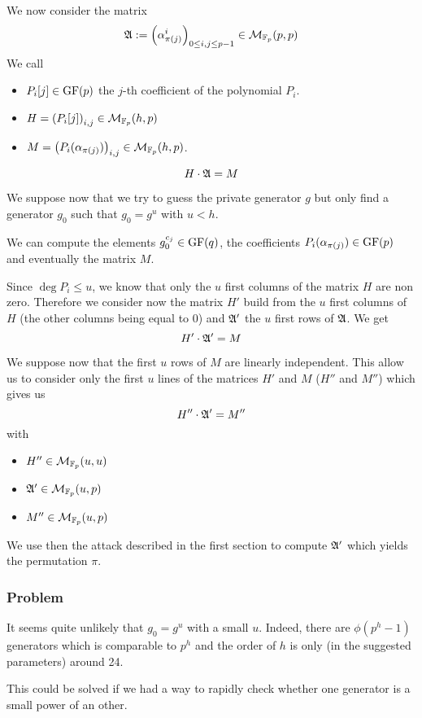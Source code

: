 \documentclass[12pt,a4paper,titlepage]{article}
\begin{document}
We now consider the matrix
$$ \frak{A} := \left( \alpha_{\pi(j)}^i \right)_{0 \leq i,j \leq p-1} \in \mathcal{M}_{\mathbb{F}_p}(p,p)$$
We call
\begin{itemize}
\item $P_i[j] \in \text{GF}(p)$ the $j$-th coefficient of the polynomial $P_i$.
\item $H = \left( P_i[j] \right)_{i,j} \in \mathcal{M}_{\mathbb{F}_p}(h,p)$
\item $M = \left( P_i(\alpha_{\pi(j)}) \right)_{i,j} \in \mathcal{M}_{\mathbb{F}_p}(h,p)$.
\end{itemize}

$$ H \cdot \frak{A} = M $$

We suppose now that we try to guess the private generator $g$ but only find a generator $g_0$ such that $g_0 = g^u$ with $u < h$.

We can compute the elements $g_0^{c_j} \in \text{GF}(q)$, the coefficients $P_i(\alpha_{\pi(j)}) \in \text{GF}(p)$ and eventually the matrix $M$.

Since $\deg P_i \leq u$, we know that only the $u$ first columns of the matrix $H$ are non zero. Therefore we consider now the matrix $H'$ build from the $u$ first columns of $H$ (the other columns being equal to 0) and $\frak{A}'$ the $u$ first rows of $\frak{A}$.
We get
$$ H' \cdot \frak{A}' = M $$

We suppose now that the first $u$ rows of $M$ are linearly independent. This allow us to consider only the first $u$ lines of the matrices $H'$ and $M$ ($H''$ and $M''$) which gives us
$$ H'' \cdot \frak{A}' = M'' $$
with
\begin{itemize}
\item $H'' \in \mathcal{M}_{\mathbb{F}_p}(u,u)$
\item $\frak{A}' \in \mathcal{M}_{\mathbb{F}_p}(u,p)$
\item $M'' \in \mathcal{M}_{\mathbb{F}_p}(u,p)$
\end{itemize}

We use then the attack described in the first section to compute $\frak{A}'$ which yields the permutation $\pi$.

\subsubsection{Problem}
It seems quite unlikely that $g_0 = g^u$ with a small $u$.
Indeed, there are $\phi(p^h-1)$ generators which is comparable to $p^h$ and the order of $h$ is only (in the suggested parameters) around 24. 

This could be solved if we had a way to rapidly check whether one generator is a small power of an other.
\end{document}
